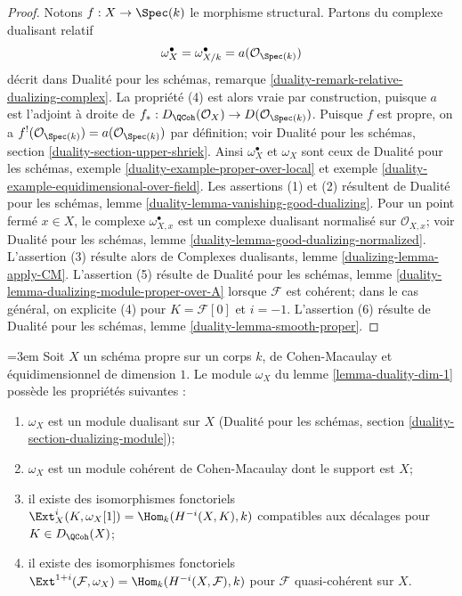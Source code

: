 \begin{proof}
Notons $f : X \to \Spec(k)$ le morphisme structural. Partons du complexe dualisant relatif $$
\omega_X^\bullet = \omega_{X/k}^\bullet = a(\mathcal{O}_{\Spec(k)})
$$ décrit dans Dualité pour les schémas, remarque \ref{duality-remark-relative-dualizing-complex}. La propriété (4) est alors vraie par construction, puisque $a$ est l'adjoint à droite de $f_* : D_\QCoh(\mathcal{O}_X) \to D(\mathcal{O}_{\Spec(k)})$. Puisque $f$ est propre, on a $f^!(\mathcal{O}_{\Spec(k)}) = a(\mathcal{O}_{\Spec(k)})$ par définition; voir Dualité pour les schémas, section \ref{duality-section-upper-shriek}. Ainsi $\omega_X^\bullet$ et $\omega_X$ sont ceux de Dualité pour les schémas, exemple \ref{duality-example-proper-over-local} et exemple \ref{duality-example-equidimensional-over-field}. Les assertions (1) et (2) résultent de Dualité pour les schémas, lemme \ref{duality-lemma-vanishing-good-dualizing}. Pour un point fermé $x \in X$, le complexe $\omega_{X, x}^\bullet$ est un complexe dualisant normalisé sur $\mathcal{O}_{X, x}$; voir Dualité pour les schémas, lemme \ref{duality-lemma-good-dualizing-normalized}. L'assertion (3) résulte alors de Complexes dualisants, lemme \ref{dualizing-lemma-apply-CM}. L'assertion (5) résulte de Dualité pour les schémas, lemme \ref{duality-lemma-dualizing-module-proper-over-A} lorsque $\mathcal{F}$ est cohérent; dans le cas général, on explicite (4) pour $K = \mathcal{F}[0]$ et $i = -1$. L'assertion (6) résulte de Dualité pour les schémas, lemme \ref{duality-lemma-smooth-proper}.
\end{proof}

\begin{lemma}
\label{lemma-duality-dim-1-CM}
{\small\emergencystretch=3em
Soit $X$ un schéma propre sur un corps $k$, de Cohen-Macaulay et équidimensionnel de dimension $1$. Le module $\omega_X$ du lemme \ref{lemma-duality-dim-1} possède les propriétés suivantes : \begin{enumerate} \item $\omega_X$ est un module dualisant sur $X$ (Dualité pour les schémas, section \ref{duality-section-dualizing-module}); \item $\omega_X$ est un module cohérent de Cohen-Macaulay dont le support est $X$; \item il existe des isomorphismes fonctoriels $\Ext^i_X(K, \omega_X[1]) = \Hom_k(H^{-i}(X, K), k)$ compatibles aux décalages pour $K \in D_\QCoh(X)$; \item il existe des isomorphismes fonctoriels $\Ext^{1 + i}(\mathcal{F}, \omega_X) = \Hom_k(H^{-i}(X, \mathcal{F}), k)$ pour $\mathcal{F}$ quasi-cohérent sur $X$.
\end{enumerate}
\par}
\end{lemma}

